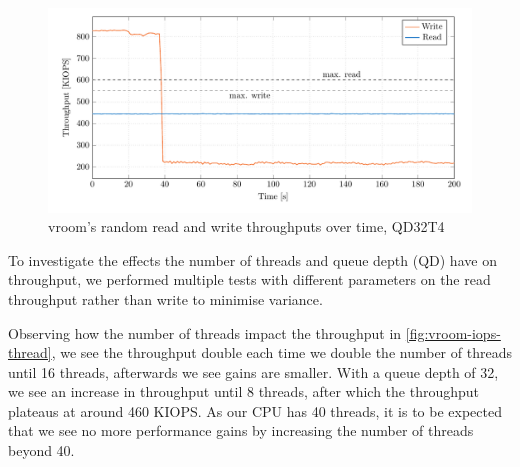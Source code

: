 \begin{figure}[H]
  \centering
    \includegraphics[width=\textwidth]{figures/vroom-iops-time}
    \caption{vroom's random read and write throughputs over time, QD32T4}
    \label{fig:vroom-iops-time}
\end{figure}

To investigate the effects the number of threads and queue depth (QD) have on throughput, we performed multiple tests with different parameters on the read throughput rather than write to minimise variance.

Observing how the number of threads impact the throughput in \autoref{fig:vroom-iops-thread}, we see the throughput double each time we double the number of threads until 16 threads, afterwards we see gains are smaller. With a queue depth of 32, we see an increase in throughput until 8 threads, after which the throughput plateaus at around 460 KIOPS. As our CPU has 40 threads, it is to be expected that we see no more performance gains by increasing the number of threads beyond 40.

